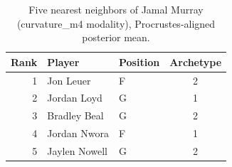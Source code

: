 \begin{table}[htbp]
  \centering\small
  \begin{tabular}{rllc}
    \toprule
    Rank & Player & Position & Archetype \\
    \midrule
    1 & Jon Leuer & F & 2 \\
    2 & Jordan Loyd & G & 1 \\
    3 & Bradley Beal & G & 2 \\
    4 & Jordan Nwora & F & 1 \\
    5 & Jaylen Nowell & G & 2 \\
    \bottomrule
  \end{tabular}
  \caption{Five nearest neighbors of Jamal Murray (curvature_m4 modality), Procrustes-aligned posterior mean.}
  \label{tab:Jamal_Murray_neighbors_curvature_m4}
\end{table}

